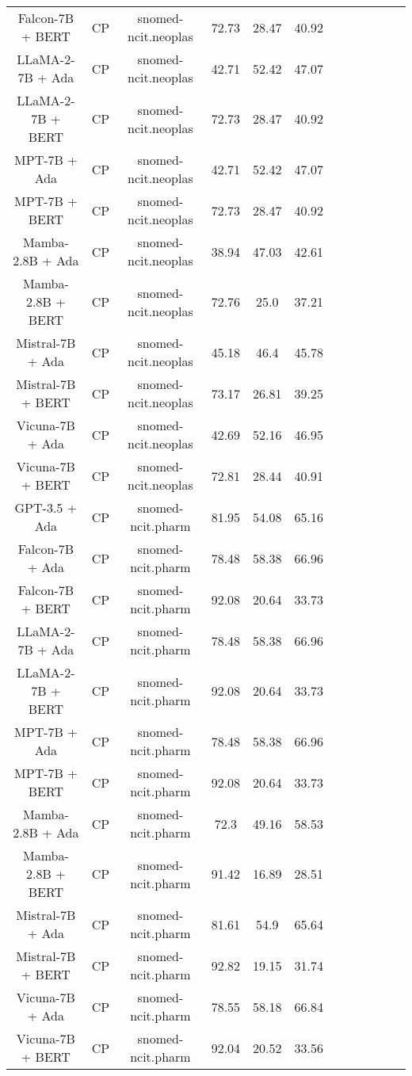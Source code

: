 \begin{table}
\begin{tabular}{|c|c|c|c|c|c|c|c|c|c|c|c|}
	Falcon-7B + BERT  & CP & snomed-ncit.neoplas  &  72.73 &  28.47 & 40.92  \\
	LLaMA-2-7B + Ada  & CP & snomed-ncit.neoplas  &  42.71 &  52.42 & 47.07  \\
	LLaMA-2-7B + BERT  & CP & snomed-ncit.neoplas  &  72.73 &  28.47 & 40.92  \\
	MPT-7B + Ada  & CP & snomed-ncit.neoplas  &  42.71 &  52.42 & 47.07  \\
	MPT-7B + BERT  & CP & snomed-ncit.neoplas  &  72.73 &  28.47 & 40.92  \\
	Mamba-2.8B + Ada  & CP & snomed-ncit.neoplas  &  38.94 &  47.03 & 42.61  \\
	Mamba-2.8B + BERT  & CP & snomed-ncit.neoplas  &  72.76 &  25.0 & 37.21  \\
	Mistral-7B + Ada  & CP & snomed-ncit.neoplas  &  45.18 &  46.4 & 45.78  \\
	Mistral-7B + BERT  & CP & snomed-ncit.neoplas  &  73.17 &  26.81 & 39.25  \\
	Vicuna-7B + Ada  & CP & snomed-ncit.neoplas  &  42.69 &  52.16 & 46.95  \\
	Vicuna-7B + BERT  & CP & snomed-ncit.neoplas  &  72.81 &  28.44 & 40.91  \\
	\hline
	GPT-3.5 + Ada  & CP & snomed-ncit.pharm  &  81.95 &  54.08 & 65.16  \\
	Falcon-7B + Ada  & CP & snomed-ncit.pharm  &  78.48 &  58.38 & 66.96  \\
	Falcon-7B + BERT  & CP & snomed-ncit.pharm  &  92.08 &  20.64 & 33.73  \\
	LLaMA-2-7B + Ada  & CP & snomed-ncit.pharm  &  78.48 &  58.38 & 66.96  \\
	LLaMA-2-7B + BERT  & CP & snomed-ncit.pharm  &  92.08 &  20.64 & 33.73  \\
	MPT-7B + Ada  & CP & snomed-ncit.pharm  &  78.48 &  58.38 & 66.96  \\
	MPT-7B + BERT  & CP & snomed-ncit.pharm  &  92.08 &  20.64 & 33.73  \\
	Mamba-2.8B + Ada  & CP & snomed-ncit.pharm  &  72.3 &  49.16 & 58.53  \\
	Mamba-2.8B + BERT  & CP & snomed-ncit.pharm  &  91.42 &  16.89 & 28.51  \\
	Mistral-7B + Ada  & CP & snomed-ncit.pharm  &  81.61 &  54.9 & 65.64  \\
	Mistral-7B + BERT  & CP & snomed-ncit.pharm  &  92.82 &  19.15 & 31.74  \\
	Vicuna-7B + Ada  & CP & snomed-ncit.pharm  &  78.55 &  58.18 & 66.84  \\
	Vicuna-7B + BERT  & CP & snomed-ncit.pharm  &  92.04 &  20.52 & 33.56  \\
	\hline
\end{tabular}
    \end{table}
